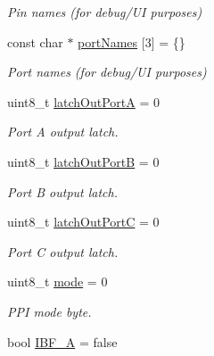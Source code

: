\begin{DoxyCompactItemize}
\begin{DoxyCompactList}\small\item\em Pin names (for debug/\-U\-I purposes) \end{DoxyCompactList}\item 
\hypertarget{classIntel8255_a2439197a04df0425206d5d23328de77d}{const char $\ast$ \hyperlink{classIntel8255_a2439197a04df0425206d5d23328de77d}{port\-Names} \mbox{[}3\mbox{]} = \{\}}\label{classIntel8255_a2439197a04df0425206d5d23328de77d}

\begin{DoxyCompactList}\small\item\em Port names (for debug/\-U\-I purposes) \end{DoxyCompactList}\item 
\hypertarget{classIntel8255_a789e21fa7684972852c58e484fc8fa05}{uint8\-\_\-t \hyperlink{classIntel8255_a789e21fa7684972852c58e484fc8fa05}{latch\-Out\-Port\-A} = 0}\label{classIntel8255_a789e21fa7684972852c58e484fc8fa05}

\begin{DoxyCompactList}\small\item\em Port A output latch. \end{DoxyCompactList}\item 
\hypertarget{classIntel8255_a6cab7d5af4469ef233e2b86734d0a002}{uint8\-\_\-t \hyperlink{classIntel8255_a6cab7d5af4469ef233e2b86734d0a002}{latch\-Out\-Port\-B} = 0}\label{classIntel8255_a6cab7d5af4469ef233e2b86734d0a002}

\begin{DoxyCompactList}\small\item\em Port B output latch. \end{DoxyCompactList}\item 
\hypertarget{classIntel8255_ae7a6fa5ef9a676a043c28fe17fccd5cf}{uint8\-\_\-t \hyperlink{classIntel8255_ae7a6fa5ef9a676a043c28fe17fccd5cf}{latch\-Out\-Port\-C} = 0}\label{classIntel8255_ae7a6fa5ef9a676a043c28fe17fccd5cf}

\begin{DoxyCompactList}\small\item\em Port C output latch. \end{DoxyCompactList}\item 
\hypertarget{classIntel8255_a9585630ec3ff22e97c26524931dab693}{uint8\-\_\-t \hyperlink{classIntel8255_a9585630ec3ff22e97c26524931dab693}{mode} = 0}\label{classIntel8255_a9585630ec3ff22e97c26524931dab693}

\begin{DoxyCompactList}\small\item\em P\-P\-I mode byte. \end{DoxyCompactList}\item 
\hypertarget{classIntel8255_aab8c8fd1a89d777816aecbcd3b27eea8}{bool \hyperlink{classIntel8255_aab8c8fd1a89d777816aecbcd3b27eea8}{I\-B\-F\-\_\-\-A} = false}\label{classIntel8255_aab8c8fd1a89d777816aecbcd3b27eea8}


\end{DoxyCompactItemize}
